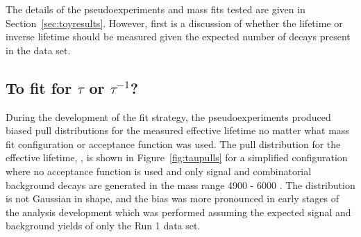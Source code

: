 { The details of the pseudoexperiments and mass fits tested are given in Section~\ref{sec:toyresults}. However, first is a discussion of whether the lifetime or inverse lifetime should be measured given the expected number of decays present in the data set.  

\subsection{To fit for $\tau$ or $\tau^{-1}$?}
\label{sec:tauORinvtau}
During the development of the fit strategy, the pseudoexperiments produced biased pull distributions for the measured \bsmumu effective lifetime no matter what mass fit configuration or acceptance function was used. The pull distribution for the effective lifetime, \tmumu, is shown in Figure~\ref{fig:taupulls} for a simplified configuration where no acceptance function is used and only signal and combinatorial background decays are generated in the mass range 4900 - 6000 \mevcc. The distribution is not Gaussian in shape, and the bias was more pronounced in early stages of the analysis development which was performed assuming the expected signal and background yields of only the Run 1 data set.%

}

